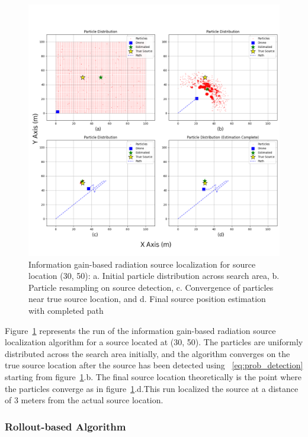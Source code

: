 \documentclass[../report.tex]{subfiles}
\begin{document}
    \begin{figure}[ht]
        \centering
        \includegraphics[width=\linewidth]{figures/entropy_algorithm_with_label.png}
        \caption{Information gain-based radiation source localization for source location (30, 50): a. Initial particle distribution across search area, 
        b. Particle resampling on source detection, 
        c. Convergence of particles near true source location, and 
        d. Final source position estimation with completed path}
        \label{fig:entropy_algorithm_with_plot}
    \end{figure}

    Figure~\ref{fig:entropy_algorithm_with_plot} represents the run of the information gain-based radiation source localization algorithm for a source located at (30, 50). The 
    particles are uniformly distributed across the search area initially, and the algorithm converges on the true source location after the source has been detected using ~\ref{eq:prob_detection} starting 
    from figure~\ref{fig:entropy_algorithm_with_plot}.b. The final source location theoretically is the point where the  particles converge as in figure~\ref{fig:entropy_algorithm_with_plot}.d.This 
    run localized the source at a distance of 3 meters from the actual source location.


    \subsubsection{Rollout-based Algorithm}
\end{document}
